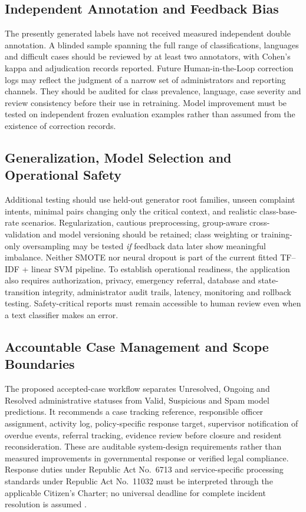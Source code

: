 \subsection{Independent Annotation and Feedback Bias}
The presently generated labels have not received measured independent double annotation. A blinded sample spanning the full range of classifications, languages and difficult cases should be reviewed by at least two annotators, with Cohen's kappa and adjudication records reported. Future Human-in-the-Loop correction logs may reflect the judgment of a narrow set of administrators and reporting channels. They should be audited for class prevalence, language, case severity and review consistency before their use in retraining. Model improvement must be tested on independent frozen evaluation examples rather than assumed from the existence of correction records.

\subsection{Generalization, Model Selection and Operational Safety}
Additional testing should use held-out generator root families, unseen complaint intents, minimal pairs changing only the critical context, and realistic class-base-rate scenarios. Regularization, cautious preprocessing, group-aware cross-validation and model versioning should be retained; class weighting or training-only oversampling may be tested \emph{if} feedback data later show meaningful imbalance. Neither SMOTE nor neural dropout is part of the current fitted TF--IDF + linear SVM pipeline. To establish operational readiness, the application also requires authorization, privacy, emergency referral, database and state-transition integrity, administrator audit trails, latency, monitoring and rollback testing. Safety-critical reports must remain accessible to human review even when a text classifier makes an error.

\subsection{Accountable Case Management and Scope Boundaries}
The proposed accepted-case workflow separates Unresolved, Ongoing and Resolved administrative statuses from Valid, Suspicious and Spam model predictions. It recommends a case tracking reference, responsible officer assignment, activity log, policy-specific response target, supervisor notification of overdue events, referral tracking, evidence review before closure and resident reconsideration. These are auditable system-design requirements rather than measured improvements in governmental response or verified legal compliance. Response duties under Republic Act No.~6713 and service-specific processing standards under Republic Act No.~11032 must be interpreted through the applicable Citizen's Charter; no universal deadline for complete incident resolution is assumed \cite{ra6713,ra11032,dcr}.


